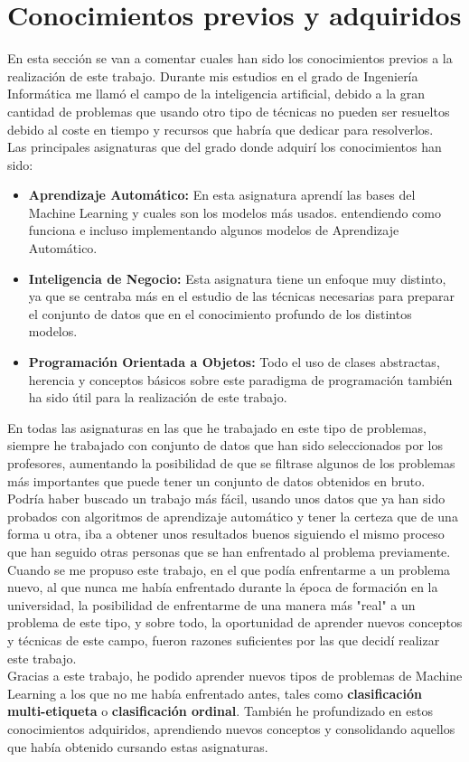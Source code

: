 \section{Conocimientos previos y adquiridos}
En esta sección se van a comentar cuales han sido los conocimientos previos a la realización de este trabajo. Durante mis estudios en el grado de Ingeniería Informática me llamó el campo de la inteligencia artificial, debido a la gran cantidad de problemas que usando otro tipo de técnicas no pueden ser resueltos debido al coste en tiempo y recursos que habría que dedicar para resolverlos.\\
Las principales asignaturas que del grado donde adquirí los conocimientos han sido:
\begin{itemize}
	\item \textbf{Aprendizaje Automático:} En esta asignatura aprendí las bases del Machine Learning y cuales son los modelos más usados. entendiendo como funciona e incluso implementando algunos modelos de Aprendizaje Automático.
	\item \textbf{Inteligencia de Negocio:} Esta asignatura tiene un enfoque muy distinto, ya que se centraba más en el estudio de las técnicas necesarias para preparar el conjunto de datos que en el conocimiento profundo de los distintos modelos.
	\item \textbf{Programación Orientada a Objetos:} Todo el uso de clases abstractas, herencia y conceptos básicos sobre este paradigma de programación también ha sido útil para la realización de este trabajo.
\end{itemize}
En todas las asignaturas en las que he trabajado en este tipo de problemas, siempre he trabajado con conjunto de datos que han sido seleccionados por los profesores, aumentando la posibilidad de que se filtrase algunos de los problemas más importantes que puede tener un conjunto de datos obtenidos en bruto.\\
Podría haber buscado un trabajo más fácil, usando unos datos que ya han sido probados con algoritmos de aprendizaje automático y tener la certeza que de una forma u otra, iba a obtener unos resultados buenos siguiendo el mismo proceso que han seguido otras personas que se han enfrentado al problema previamente. Cuando se me propuso este trabajo, en el que podía enfrentarme a un problema nuevo, al que nunca me había enfrentado durante la época de formación en la universidad, la posibilidad de enfrentarme de una manera más "real" a un problema de este tipo, y sobre todo, la oportunidad de aprender nuevos conceptos y técnicas de este campo, fueron razones suficientes por las que decidí realizar este trabajo.\\
\linebreak
Gracias a este trabajo, he podido aprender nuevos tipos de problemas de Machine Learning a los que no me había enfrentado antes, tales como \textbf{clasificación multi-etiqueta} o \textbf{clasificación ordinal}. También he profundizado en estos conocimientos adquiridos, aprendiendo nuevos conceptos y consolidando aquellos que había obtenido cursando estas asignaturas.\\
\clearpage
